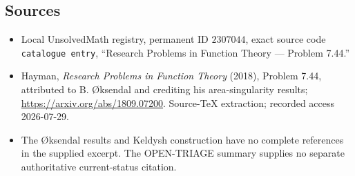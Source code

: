 \documentclass[11pt]{article}
\begin{document}
\subsection{Sources}
\begin{itemize}
\item Local UnsolvedMath registry, permanent ID \(2307044\), exact source code \texttt{catalogue entry}, ``Research Problems in Function Theory --- Problem 7.44.''
\item Hayman, \emph{Research Problems in Function Theory} (2018), Problem 7.44, attributed to B. \O{}ksendal and crediting his area-singularity results; \url{https://arxiv.org/abs/1809.07200}. Source-TeX extraction; recorded access 2026-07-29.
\item The \O{}ksendal results and Keldysh construction have no complete references in the supplied excerpt. The OPEN-TRIAGE summary supplies no separate authoritative current-status citation.
\end{itemize}
\end{document}
